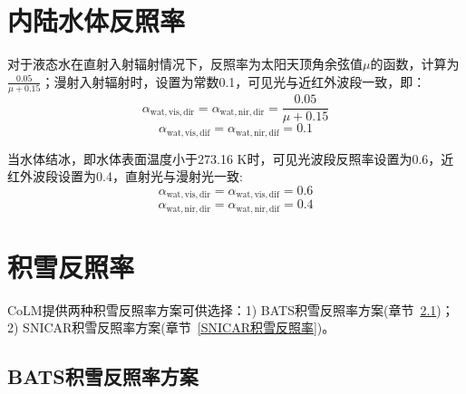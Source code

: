 \section{内陆水体反照率}
对于液态水在直射入射辐射情况下，反照率为太阳天顶角余弦值$\mu$的函数，计算为$\frac{0.05}{\mu+0.15}$；漫射入射辐射时，设置为常数0.1，可见光与近红外波段一致，即：
%
\begin{equation}
  \alpha_{\mathrm{wat,vis,dir}}=\alpha_{\mathrm{wat,nir,dir}}= \frac {0.05}{\mu+0.15}
\end{equation}
%
\begin{equation}
  \alpha_{\mathrm{wat,vis,dif}}=\alpha_{\mathrm{wat,nir,dif}}=0.1
\end{equation}

当水体结冰，即水体表面温度小于273.16 K时，可见光波段反照率设置为0.6，近红外波段设置为0.4，直射光与漫射光一致:
%
\begin{equation}
  \alpha_{\mathrm{wat,vis,dir}}=\alpha_{\mathrm{wat,vis,dif}}=0.6
\end{equation}
%
\begin{equation}
  \alpha_{\mathrm{wat,nir,dir}}=\alpha_{\mathrm{wat,nir,dif}}=0.4
\end{equation}

\section{积雪反照率}

CoLM提供两种积雪反照率方案可供选择：1) BATS积雪反照率方案(章节~\ref{BATS积雪反照率})；2) SNICAR积雪反照率方案(章节~\ref{SNICAR积雪反照率})。

\subsection{BATS积雪反照率方案}\label{BATS积雪反照率}

